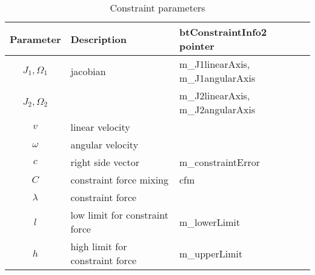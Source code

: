 \begin {table}[htb!]
\begin{center}
\begin{tabular}{|c| l| l|}
\hline
{\bf Parameter} & {\bf Description} & {\bf btConstraintInfo2 pointer}\\  \hline
$J_1, \Omega_1$ & jacobian & m\_J1linearAxis, m\_J1angularAxis \\
$J_2, \Omega_2$ & & m\_J2linearAxis, m\_J2angularAxis \\ \hline
$v$ & linear velocity & \\ \hline
$\omega$ & angular velocity & \\ \hline
$c$        &  right side vector   & m\_constraintError \\ \hline
$C$  & constraint force mixing & cfm \\  \hline
$\lambda$ & constraint force &  \\ \hline
$l$ & low limit for constraint force & m\_lowerLimit \\ \hline
$h$ & high limit for constraint force & m\_upperLimit \\ \hline
\end {tabular}
\end{center}
\caption {Constraint parameters} \label{tab:constraintParameters} 
\end {table}
